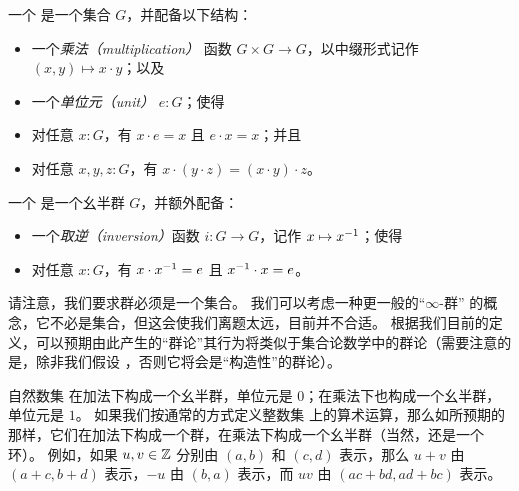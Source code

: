 \begin{defn}
  一个
  是一个集合 $G$，并配备以下结构：
  \begin{itemize}
  \item 一个\emph{乘法（multiplication）}
    函数 $G\times G\to G$，以中缀形式记作 $(x,y) \mapsto x\cdot y$；以及
  \item 一个\emph{单位元（unit）}
    $e:G$；使得
  \item 对任意 $x:G$，有 $x\cdot e = x$ 且 $e\cdot x = x$；并且
  \item 对任意 $x,y,z:G$，有 $x\cdot (y\cdot z) = (x\cdot y)\cdot z$。
  \end{itemize}
  一个
  是一个幺半群 $G$，并额外配备：
  \begin{itemize}
  \item 一个\emph{取逆（inversion）}函数 $i:G\to G$，记作 $x\mapsto \mathord{{x}^{-1}}$；使得
  \item 对任意 $x:G$，有 $x\cdot \mathord{{x}^{-1}} = e$ 且 $\mathord{{x}^{-1}} \cdot x = e$。
  \end{itemize}
\end{defn}

\begin{rmk}\label{rmk:infty-group}
请注意，我们要求群必须是一个集合。
我们可以考虑一种更一般的``$\infty$-群''%
的概念，它不必是集合，但这会使我们离题太远，目前并不合适。
根据我们目前的定义，可以预期由此产生的``群论''其行为将类似于集合论数学中的群论（需要注意的是，除非我们假设 \LEM{}，否则它将会是``构造性''的群论）。
\end{rmk}

\begin{eg}
  自然数集 \N 在加法下构成一个幺半群，单位元是 $0$；在乘法下也构成一个幺半群，单位元是 $1$。
  如果我们按通常的方式定义整数集 \Z 上的算术运算，那么如所预期的那样，它们在加法下构成一个群，在乘法下构成一个幺半群（当然，还是一个环）。
  例如，如果 $u, v \in \mathbb{Z}$ 分别由 $(a,b)$ 和 $(c,d)$ 表示，那么 $u + v$ 由 $(a + c, b + d)$ 表示，$-u$ 由 $(b, a)$ 表示，而 $u v$ 由 $(a c + b d, a d + b c)$ 表示。
\end{eg}

